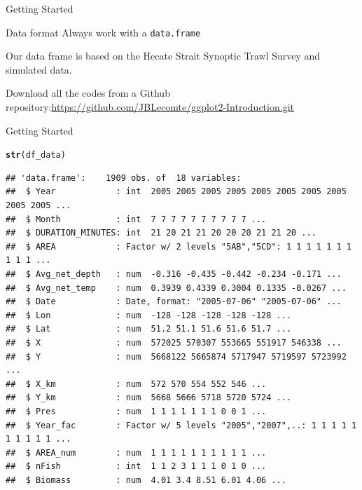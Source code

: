 \documentclass{beamer}\usepackage[]{graphicx}\usepackage[]{color}
\makeatletter
\newcommand{\hlstd}[1]{\textcolor[rgb]{0.345,0.345,0.345}{#1}}%
\newcommand{\hlkwd}[1]{\textcolor[rgb]{0.737,0.353,0.396}{\textbf{#1}}}%
\newenvironment{kframe}{%
 \def\at@end@of@kframe{}%
 \ifinner\ifhmode%
  \def\at@end@of@kframe{\end{minipage}}%
  \begin{minipage}{\columnwidth}%
 \fi\fi%
 \def\FrameCommand##1{\hskip\@totalleftmargin \hskip-\fboxsep
 \colorbox{shadecolor}{##1}\hskip-\fboxsep
     \hskip-\linewidth \hskip-\@totalleftmargin \hskip\columnwidth}%
 \MakeFramed {\advance\hsize-\width
   \@totalleftmargin\z@ \linewidth\hsize
   \@setminipage}}%
 {\par\unskip\endMakeFramed%
 \at@end@of@kframe}
\newenvironment{knitrout}{}{} %
\makeatother
\begin{document}
\begin{frame}[fragile]{Getting Started}

\begin{alertblock}{Data format}
Always work with a \texttt{data.frame}
\end{alertblock}

\vspace{1cm}

Our data frame is based on the Hecate Strait Synoptic Trawl Survey and simulated data.
\vspace{1cm}

Download all the codes from a Github repository:\newline \url{https://github.com/JBLecomte/ggplot2-Introduction.git}
\end{frame}

\begin{frame}[fragile]{Getting Started}
\begin{knitrout}\scriptsize
{}\color{fgcolor}\begin{kframe}
\begin{alltt}
\hlkwd{str}\hlstd{(df_data)}
\end{alltt}
\begin{verbatim}
## 'data.frame':	1909 obs. of  18 variables:
##  $ Year            : int  2005 2005 2005 2005 2005 2005 2005 2005 2005 2005 ...
##  $ Month           : int  7 7 7 7 7 7 7 7 7 7 ...
##  $ DURATION_MINUTES: int  21 20 21 21 20 20 20 21 21 20 ...
##  $ AREA            : Factor w/ 2 levels "5AB","5CD": 1 1 1 1 1 1 1 1 1 1 ...
##  $ Avg_net_depth   : num  -0.316 -0.435 -0.442 -0.234 -0.171 ...
##  $ Avg_net_temp    : num  0.3939 0.4339 0.3004 0.1335 -0.0267 ...
##  $ Date            : Date, format: "2005-07-06" "2005-07-06" ...
##  $ Lon             : num  -128 -128 -128 -128 -128 ...
##  $ Lat             : num  51.2 51.1 51.6 51.6 51.7 ...
##  $ X               : num  572025 570307 553665 551917 546338 ...
##  $ Y               : num  5668122 5665874 5717947 5719597 5723992 ...
##  $ X_km            : num  572 570 554 552 546 ...
##  $ Y_km            : num  5668 5666 5718 5720 5724 ...
##  $ Pres            : num  1 1 1 1 1 1 1 0 0 1 ...
##  $ Year_fac        : Factor w/ 5 levels "2005","2007",..: 1 1 1 1 1 1 1 1 1 1 ...
##  $ AREA_num        : num  1 1 1 1 1 1 1 1 1 1 ...
##  $ nFish           : int  1 1 2 3 1 1 1 0 1 0 ...
##  $ Biomass         : num  4.01 3.4 8.51 6.01 4.06 ...
\end{verbatim}
\end{kframe}
\end{knitrout}
\end{frame}
\end{document}
